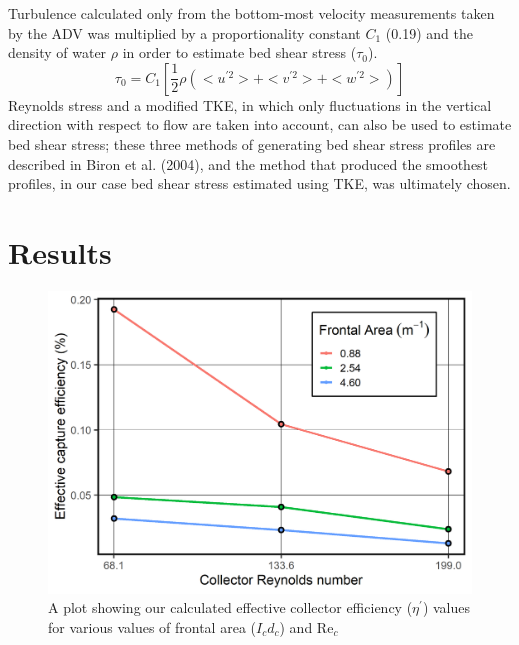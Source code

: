 \documentclass{scrreprt}
\newcommand\Rey{\mathrm{Re}}
\begin{document}
Turbulence calculated only from the bottom-most velocity measurements taken by the ADV was multiplied by a proportionality constant $C_{1}$ (0.19) and the density of water $\rho$ in order to estimate bed shear stress ($\tau_{0}$).
\[\tau_{0} = C_{1}[\frac{1}{2}\rho(<u^{'2}> + <v^{'2}> + <w^{'2}>)]\]
Reynolds stress and a modified TKE, in which only fluctuations in the vertical direction with respect to flow are taken into account, can also be used to estimate bed shear stress; these three methods of generating bed shear stress profiles are described in Biron et al. (2004), and the method that produced the smoothest profiles, in our case bed shear stress estimated using TKE, was ultimately chosen.  


\chapter{Results}

\begin{figure}[htbp]
\includegraphics[width=6in]{etafig.png}
\centering
\caption{A plot showing our calculated effective collector efficiency ($\eta^\prime$) values for various values of frontal area ($I_cd_c$) and $\Rey_c$}
\label{fig:eta}
\end{figure}
\end{document}
